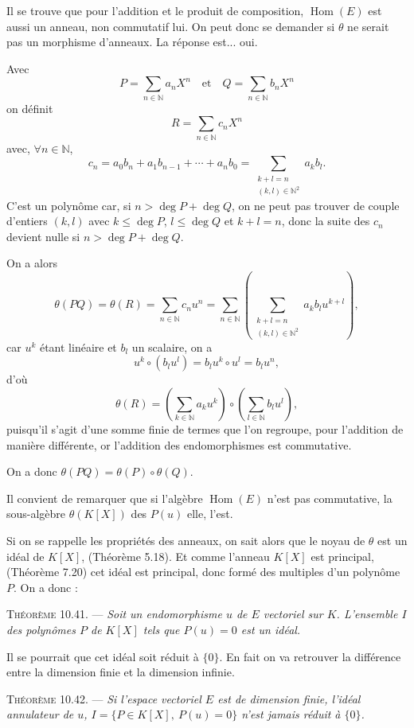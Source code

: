 Il se trouve que pour l'addition et le produit de composition, $\operatorname{Hom}(E)$ est aussi un anneau, non commutatif lui. On peut donc se demander si $\theta$ ne serait pas un morphisme d'anneaux. La réponse est... oui.

Avec
\[
P=\sum_{n\in\mathbb N}a_nX^n
\quad\text{et}\quad
Q=\sum_{n\in\mathbb N}b_nX^n
\]
on définit
\[
R=\sum_{n\in\mathbb N}c_nX^n
\]
avec, $\forall n\in\mathbb N$,
\[
c_n=a_0b_n+a_1b_{n-1}+\cdots+a_nb_0
=\sum_{\substack{k+l=n\\(k,l)\in\mathbb N^2}}a_kb_l.
\]
C'est un polynôme car, si $n>\deg P+\deg Q$, on ne peut pas trouver de couple d'entiers $(k,l)$ avec $k\le\deg P$, $l\le\deg Q$ et $k+l=n$, donc la suite des $c_n$ devient nulle si $n>\deg P+\deg Q$.

On a alors
\[
\theta(PQ)=\theta(R)=\sum_{n\in\mathbb N}c_nu^n
=\sum_{n\in\mathbb N}\left(\sum_{\substack{k+l=n\\(k,l)\in\mathbb N^2}}a_kb_lu^{k+l}\right),
\]
car $u^k$ étant linéaire et $b_l$ un scalaire, on a
\[
u^k\circ(b_lu^l)=b_lu^k\circ u^l=b_lu^n,
\]
d'où
\[
\theta(R)=\left(\sum_{k\in\mathbb N}a_ku^k\right)
\circ\left(\sum_{l\in\mathbb N}b_lu^l\right),
\]
puisqu'il s'agit d'une somme finie de termes que l'on regroupe, pour l'addition de manière différente, or l'addition des endomorphismes est commutative.

On a donc $\theta(PQ)=\theta(P)\circ\theta(Q)$.

Il convient de remarquer que si l'algèbre $\operatorname{Hom}(E)$ n'est pas commutative, la sous-algèbre $\theta(K[X])$ des $P(u)$ elle, l'est.

Si on se rappelle les propriétés des anneaux, on sait alors que le noyau de $\theta$ est un idéal de $K[X]$, (Théorème 5.18). Et comme l'anneau $K[X]$ est principal, (Théorème 7.20) cet idéal est principal, donc formé des multiples d'un polynôme $P$. On a donc :

\medskip\noindent\textsc{Théorème 10.41.} --- \emph{Soit un endomorphisme $u$ de $E$ vectoriel sur $K$. L'ensemble $I$ des polynômes $P$ de $K[X]$ tels que $P(u)=0$ est un idéal.} \bookend

Il se pourrait que cet idéal soit réduit à $\{0\}$. En fait on va retrouver la différence entre la dimension finie et la dimension infinie.

\medskip\noindent\textsc{Théorème 10.42.} --- \emph{Si l'espace vectoriel $E$ est de dimension finie, l'idéal annulateur de $u$, $I=\{P\in K[X],\ P(u)=0\}$ n'est jamais réduit à $\{0\}$.}


